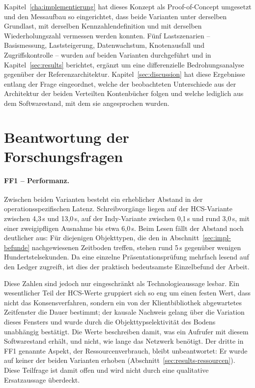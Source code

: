 Kapitel~\ref{cha:implementierung} hat dieses Konzept als Proof-of-Concept umgesetzt und den Messaufbau so eingerichtet, dass beide Varianten unter derselben Grundlast, mit derselben Kennzahlendefinition und mit derselben Wiederholungszahl vermessen werden konnten. Fünf Lastszenarien -- Basismessung, Laststeigerung, Datenwachstum, Knotenausfall und Zugriffskontrolle -- wurden auf beiden Varianten durchgeführt und in Kapitel~\ref{sec:results} berichtet, ergänzt um eine differenzielle Bedrohungsanalyse gegenüber der Referenzarchitektur. Kapitel~\ref{sec:discussion} hat diese Ergebnisse entlang der Frage eingeordnet, welche der beobachteten Unterschiede aus der Architektur der beiden Verteilten Kontenbücher folgen und welche lediglich aus dem Softwarestand, mit dem sie angesprochen wurden.

\section{Beantwortung der Forschungsfragen}
\label{sec:conclusion-forschungsfragen}

\paragraph{FF1 -- Performanz.} Zwischen beiden Varianten besteht ein erheblicher Abstand in der operationsspezifischen Latenz. Schreibvorgänge liegen auf der HCS-Variante zwischen 4,3\,s und 13,0\,s, auf der Indy-Variante zwischen 0,1\,s und rund 3,0\,s, mit einer zweigipfligen Ausnahme bis etwa 6,0\,s. Beim Lesen fällt der Abstand noch deutlicher aus: Für diejenigen Objekttypen, die den in Abschnitt~\ref{sec:impl-befunde} nachgewiesenen Zeitboden treffen, stehen rund 5\,s gegenüber wenigen Hundertstelsekunden. Da eine einzelne Präsentationsprüfung mehrfach lesend auf den Ledger zugreift, ist dies der praktisch bedeutsamste Einzelbefund der Arbeit.

Diese Zahlen sind jedoch nur eingeschränkt als Technologieaussage lesbar. Ein wesentlicher Teil der HCS-Werte gruppiert sich so eng um einen festen Wert, dass nicht das Konsensverfahren, sondern ein von der Klientbibliothek abgewartetes Zeitfenster die Dauer bestimmt; der kausale Nachweis gelang über die Variation dieses Fensters und wurde durch die Objekttypselektivität des Bodens unabhängig bestätigt. Die Werte beschreiben damit, was ein Aufrufer mit diesem Softwarestand erhält, und nicht, wie lange das Netzwerk benötigt. Der dritte in FF1 genannte Aspekt, der Ressourcenverbrauch, bleibt unbeantwortet: Er wurde auf keiner der beiden Varianten erhoben (Abschnitt~\ref{sec:results-ressourcen}). Diese Teilfrage ist damit offen und wird nicht durch eine qualitative Ersatzaussage überdeckt.

